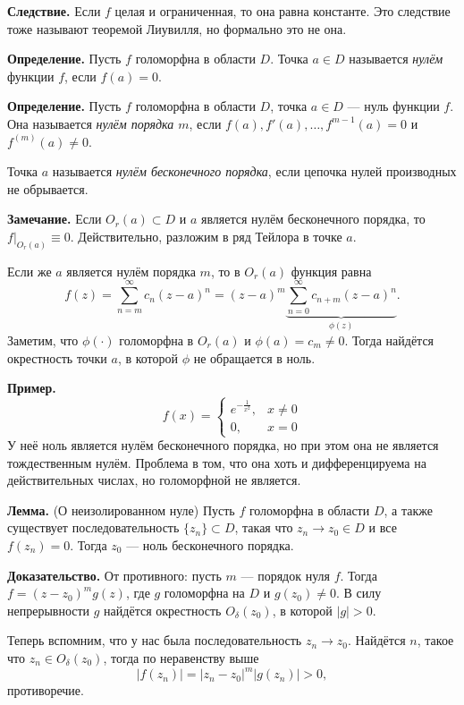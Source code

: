 \QED

\textbf{Следствие.} Если $f$ целая и ограниченная, то она равна константе.
Это следствие тоже называют теоремой Лиувилля, но формально это не она.

\textbf{Определение.} Пусть $f$ голоморфна в области $D$.
Точка $a \in D$ называется \textit{нулём} функции $f$, если $f(a) = 0$.

\textbf{Определение.} Пусть $f$ голоморфна в области $D$, точка $a \in D$ --- нуль функции $f$.
Она называется \textit{нулём порядка $m$}, если $f(a), f'(a), \dots, f^{m-1}(a) = 0$ и $f^{(m)}(a) \ne 0$.

Точка $a$ называется \textit{нулём бесконечного порядка}, если цепочка нулей производных не обрывается.

\textbf{Замечание.} Если $O_r(a) \subset D$ и $a$ является нулём бесконечного порядка, то $f|_{O_r(a)} \equiv 0$.
Действительно, разложим в ряд Тейлора в точке $a$.

Если же $a$ является нулём порядка $m$, то в $O_r(a)$ функция равна
\[
    f(z) = \sum_{n=m}^{\infty} c_n (z - a)^n = (z - a)^m \underbrace{\sum_{n=0}^{\infty} c_{n+m} (z - a)^n}_{\phi(z)}.
\]
Заметим, что $\phi(\cdot)$ голоморфна в $O_r(a)$ и $\phi(a) = c_m \ne 0$.
Тогда найдётся окрестность точки $a$, в которой $\phi$ не обращается в ноль.

\textbf{Пример.}
\[
    f(x) =
    \begin{cases}
        e^{-\frac{1}{x^2}}, & x \ne 0 \\
        0, & x = 0
    \end{cases}
\]
У неё ноль является нулём бесконечного порядка, но при этом она не является тождественным нулём.
Проблема в том, что она хоть и дифференцируема на действительных числах, но голоморфной не является.

\textbf{Лемма.} (О неизолированном нуле) Пусть $f$ голоморфна в области $D$, а также существует последовательность $\{z_n\} \subset D$, такая что $z_n \to z_0 \in D$ и все $f(z_n) = 0$.
Тогда $z_0$ --- ноль бесконечного порядка.

\textbf{Доказательство.} От противного: пусть $m$ --- порядок нуля $f$.
Тогда $f = (z - z_0)^m g(z)$, где $g$ голоморфна на $D$ и $g(z_0) \ne 0$.
В силу непрерывности $g$ найдётся окрестность $O_\delta(z_0)$, в которой $|g| > 0$.

Теперь вспомним, что у нас была последовательность $z_n \to z_0$.
Найдётся $n$, такое что $z_n \in O_\delta(z_0)$, тогда по неравенству выше
\[
    |f(z_n)| = |z_n - z_0|^m |g(z_n)| > 0,
\]
противоречие.

